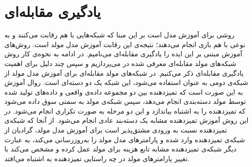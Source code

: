 \section{يادگیری مقابله‌ای}
\label{Method:GAN:Shalow}
\cite{Goodfellow2014}
روشی برای آموزش مدل 
 است بر این مبنا که شبکه‌هایی با هم رقابت می‌کنند و به نوعی با هم بازی انجام می‌دهند؛ نتیجه‌ی این رقابت آموزش مدل مولد است.
روش‌های آموزش مبتنی بر این ایده را یادگیری مقابله‌ای می‌نامیم.
در ادامه به نحوه‌ی کار روش شبکه‌های مولد مقابله‌ای معرفی شده در
\cite{Goodfellow2014}
می‌پردازیم و سپس چند دلیل برای اهمیت یادگیری مقابله‌ای‌ ذکر می‌کنیم.
\newline
در شبکه‌های مولد مقابله‌ای برای آموزش مدل مولد از شبکه‌ی دومی به عنوان
استفاده می‌شود، این شبکه‌ یک
دو دسته‌ای است. روال آموزش به این صورت است که تمیزدهنده بین دو مجموعه داده‌ی واقعی و داده‌های تولید شده توسط مولد دسته‌بندی انجام می‌دهد، سپس شبکه‌ی مولد به سمتی سوق داده می‌شود که تمیزدهنده را به اشتباه بیاندازد و این دو مرحله به صورت تکراری انجام می‌شود.
 در این روش آموزش تمیزدهنده مشابه یک دسته‌بند عادی انجام می‌شود.
 از آنجا که شبکه‌ی تمیزدهنده نسبت به ورودی مشتق‌پذیر است برای آموزش مدل مولد، گرادیان از شبکه‌ی تمیزدهنده وارد شده و پارامتر‌های مدل مولد را به‌روزرسانی می‌کند، به عبارت دیگر شبکه‌ی تمیزدهنده مشابه تابع هزینه برای مولد عمل کرده و مشخص می‌کند با تغییر پارامتر‌های مولد در چه راستایی تمیزدهنده به اشتباه می‌افتد.
